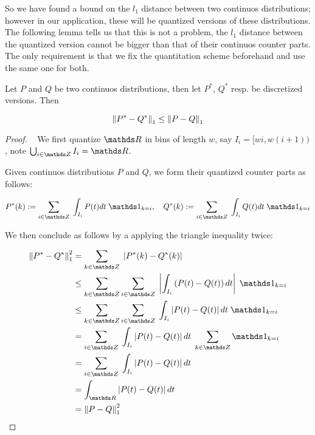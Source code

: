 So we have found a bound on the $l_1$ distance between two continuos distributions; however in our
application, these will be quantized versions of these distributions. The following lemma tells us 
that this is not a problem, the $l_1$ distance between the quantized version cannot be bigger than 
that of their continuos counter parts. The only requirement is that we fix the quantitation scheme
beforehand and use the same one for both.

\begin{lemma}
    Let $P$ and $Q$ be two continuos distributions, then let $P^*$, $Q^*$ resp. be discretized versions.
    Then

    $$
        \left\lVert P^* - Q^*\right\rVert_1 \leq \left\lVert P - Q\right\rVert_1 
    $$
    \label{lemma:quantisation}
\end{lemma}

\begin{proof}
    ~
    We first quantize $\R$ in bins of length $w$, say $I_i = [wi, w(i + 1))$, note 
    $\bigcup_{i \in \Z} I_i = \R$.

    Given continuos distributions $P$ and $Q$, we form their quantized counter parts as
    follows:

    $$
        P^*(k) := \sum _{i \in \Z} \; \int_{I_i} P(t) dt \; \Ind_{k  = i}
        , \quad   Q^*(k) := \sum _{i \in \Z} \; \int_{I_i} Q(t) dt \; \Ind_{k  = i}
    $$

    We then conclude as follows by a applying the triangle inequality twice:

    \begin{align*}
        \norm{P^* - Q^*}_1^2 &= \sum _{k \in \Z} \; \left| P^*(k) - Q^*(k)\right|  \\
        &\leq \sum _{k \in \Z} \sum _{i \in \Z} \; \left| \int_{I_i} \left(P(t) - Q(t)\right) dt \right|  \; \Ind_{k  = i} \\
        &\leq \sum _{k \in \Z} \sum _{i \in \Z} \;  \int_{I_i} \left|P(t) - Q(t)\right| dt  \; \Ind_{k  = i} \\
        &= \sum _{i \in \Z} \;  \int_{I_i} \left|P(t) - Q(t)\right| dt  \; \sum _{k \in \Z} \Ind_{k  = i} \\
        &= \sum _{i \in \Z} \;  \int_{I_i} \left|P(t) - Q(t)\right| dt \\
        &= \int_{\R} \left|P(t) - Q(t)\right| dt \\
        &= \norm{P - Q}_1^2
    \end{align*}

\end{proof}


